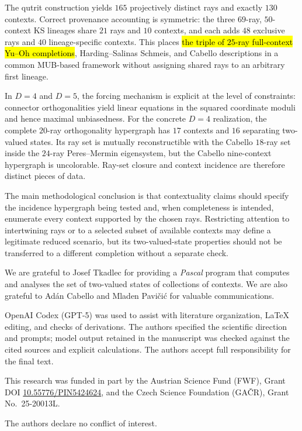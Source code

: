 \documentclass[%
  reprint,
  superscriptaddress,
  showpacs,
  showkeys,
  amsmath,amssymb,
  pra,
  longbibliography,
  floatfix,
  x11names
]{revtex4-2}
\newcommand{\rev}[1]{{#1}}
\newenvironment{revision}{\begingroup}{\endgroup}
\newcommand{\corr}[1]{{\color{red}\hl{#1}}}
\begin{document}
\begin{revision}
The qutrit construction yields $165$ projectively distinct rays and exactly $130$ contexts.  Correct provenance accounting is symmetric: the three $69$-ray, $50$-context KS lineages share $21$ rays and $10$ contexts, and each adds $48$ exclusive rays and $40$ lineage-specific contexts.  This places \corr{the triple of $25$-ray full-context Yu--Oh completions}, Harding--Salinas Schmeis, and Cabello descriptions in a common MUB-based framework without assigning shared rays to an arbitrary first lineage.

In $D=4$ and $D=5$, the forcing mechanism is explicit at the level of constraints: connector orthogonalities yield linear equations in the squared coordinate moduli and hence maximal unbiasedness.  For the concrete $D=4$ realization, the complete $20$-ray orthogonality hypergraph has $17$ contexts and $16$ separating two-valued states.  Its ray set is mutually reconstructible with the Cabello $18$-ray set inside the $24$-ray Peres--Mermin eigensystem, but the Cabello nine-context hypergraph is uncolorable.  Ray-set closure and context incidence are therefore distinct pieces of data.

The main methodological conclusion is that contextuality claims should specify the incidence hypergraph being tested and, when completeness is intended, enumerate every context supported by the chosen rays.  Restricting attention to intertwining rays or to a selected subset of available contexts may define a legitimate reduced scenario, but its two-valued-state properties should not be transferred to a different completion without a separate check.
\end{revision}

\begin{acknowledgments}
We are grateful to Josef Tkadlec for providing a {\em Pascal} program that computes and analyses the set of two-valued states of collections of contexts.
We are also grateful to Ad\'{a}n Cabello and Mladen Pavi{\v{c}}i{\'{c}} for valuable communications.

\rev{OpenAI Codex (GPT-5) was used to assist with literature organization, \LaTeX{}
editing, and checks of derivations.  The authors
specified the scientific
direction and prompts; model output retained in the manuscript was checked
against the cited sources and explicit calculations.  The authors accept
full
responsibility for the final text.}

This research was funded in part by the Austrian
Science Fund (FWF), Grant DOI \href{https://doi.org/10.55776/PIN5424624}{10.55776/PIN5424624},
and the Czech Science
Foundation (GA\v{C}R), Grant No.~25-20013L.

The authors declare no conflict of interest.
\end{acknowledgments}
\end{document}

